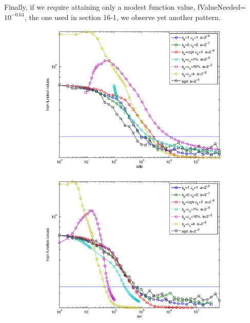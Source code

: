 \documentclass[12pt]{article}
\begin{document}
	\newpage
	
	Finally, if we require attaining only a modest function value, fValueNeeded=$10^{-0.64}$, the one used in section 16-1, we observe yet another pattern. 
	
	\begin{figure}[H]
	\begin{subfigure}[b]{.5\linewidth}
		        \includegraphics[width=4in]{Figures/whowins3-1.eps}
	\end{subfigure}%
	\begin{subfigure}[b]{.5\linewidth}
		        \includegraphics[width=4in]{Figures/whowins3-2.eps}
	\end{subfigure}%


\end{figure}
\end{document}
